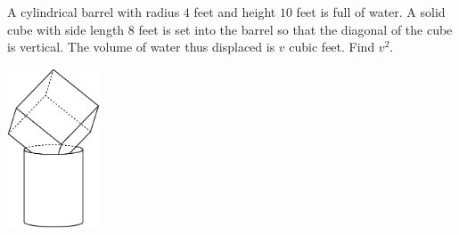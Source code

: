 A cylindrical barrel with radius $4$ feet and height $10$ feet is full of water. A solid cube with side length $8$ feet is set into the barrel so that the diagonal of the cube is vertical. The volume of water thus displaced is $v$ cubic feet. Find $v^2$.

\begin{center}
\includegraphics[width = 27.6mm]{img/fig0.png}
\end{center}